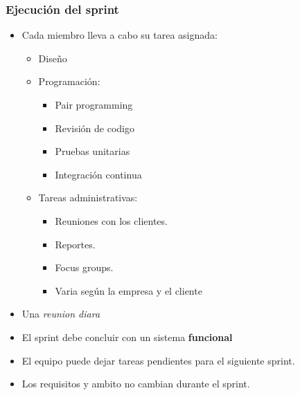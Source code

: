 \documentclass{beamer}
\begin{document}
\begin{frame}
    \frametitle{Ejecuci\'on del sprint}
    \begin{itemize}
        \item{Cada miembro lleva a cabo su tarea asignada:
            \begin{itemize}
                \item{Dise\~no}
                \item{Programaci\'on:
                    \begin{itemize}
                        \item{Pair programming}
                        \item{Revisi\'on de codigo}
                        \item{Pruebas unitarias}
                        \item{Integraci\'on continua}
                    \end{itemize}
                }
                \item{Tareas administrativas:
                    \begin{itemize}
                        \item{Reuniones con los clientes.}
                        \item{Reportes.}
                        \item{Focus groups.}
                        \item{Varia seg\'un la empresa y el cliente}
                    \end{itemize}
                }
            \end{itemize}
        }
        \item{Una \emph{reunion diara}}
        \item{El sprint debe concluir con un sistema {\bf funcional}}
        \item{El equipo puede dejar tareas pendientes para el siguiente sprint.}
        \item{Los requisitos y ambito no cambian durante el sprint.}
    \end{itemize}
\end{frame}
\end{document}
